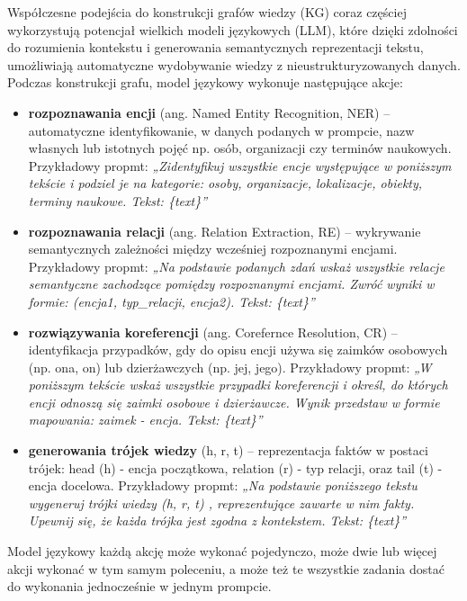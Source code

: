 \documentclass[
a4paper,
12pt,
]{article}
\begin{document}
Współczesne podejścia do konstrukcji grafów wiedzy (KG) coraz częściej wykorzystują potencjał wielkich modeli językowych (LLM), które dzięki zdolności do rozumienia kontekstu i generowania semantycznych reprezentacji tekstu, umożliwiają automatyczne wydobywanie wiedzy z nieustrukturyzowanych danych. Podczas konstrukcji grafu, model językowy wykonuje następujące akcje:
\begin{itemize}
    \item \textbf{rozpoznawania encji} (ang. Named Entity Recognition, NER) -- automatyczne identyfikowanie, w danych podanych w prompcie, nazw własnych lub istotnych pojęć np. osób, organizacji czy terminów naukowych. 
    Przykładowy propmt: \textit{„Zidentyfikuj wszystkie encje występujące w poniższym tekście i podziel je na kategorie: osoby, organizacje, lokalizacje, obiekty, terminy naukowe. Tekst: \{text\}”}
    
    \item \textbf{rozpoznawania relacji} (ang. Relation Extraction, RE) -- wykrywanie semantycznych zależności między wcześniej rozpoznanymi encjami.
    Przykładowy propmt: \textit{„Na podstawie podanych zdań wskaż wszystkie relacje semantyczne zachodzące pomiędzy rozpoznanymi encjami. Zwróć wyniki w formie: \textup{(}encja1, typ\_relacji, encja2\textup{)}. Tekst: \{text\}”}
    
    \item \textbf{rozwiązywania koreferencji} (ang. Corefernce Resolution, CR) -- identyfikacja przypadków, gdy do opisu encji używa się zaimków osobowych (np. ona, on) lub dzierżawczych (np. jej, jego).
    Przykładowy propmt: \textit{„W poniższym tekście wskaż wszystkie przypadki koreferencji i określ, do których encji odnoszą się zaimki osobowe i dzierżawcze. Wynik przedstaw w formie mapowania: zaimek - encja. Tekst: \{text\}”}
    
    \item \textbf{generowania trójek wiedzy} (h, r, t) -- reprezentacja faktów w postaci trójek: head (h) - encja początkowa, relation (r) - typ relacji, oraz tail (t) - encja docelowa.
    Przykładowy propmt: \textit{„Na podstawie poniższego tekstu wygeneruj trójki wiedzy 
    \textup{(}h, r, t\textup{)}
    , reprezentujące zawarte w nim fakty. Upewnij się, że każda trójka jest zgodna z kontekstem. Tekst: \{text\}”}
\end{itemize}

Model językowy każdą akcję może wykonać pojedynczo, może dwie lub więcej akcji wykonać w tym samym poleceniu, a może też te wszystkie zadania dostać do wykonania jednocześnie w jednym prompcie.
\end{document}
